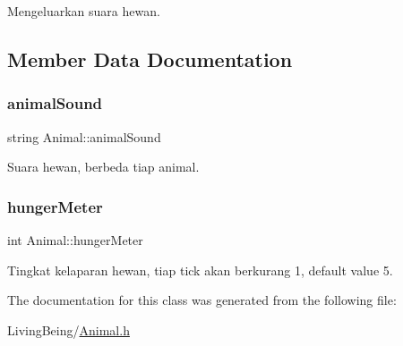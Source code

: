 Mengeluarkan suara hewan. 



\subsection{Member Data Documentation}
\mbox{\label{classAnimal_a085fb0d50fc205ef61891e33c8dcb737}} 
\subsubsection{\texorpdfstring{animalSound}{animalSound}}
{\footnotesize\ttfamily string Animal\+::animal\+Sound\hspace{0.3cm}{\ttfamily [protected]}}



Suara hewan, berbeda tiap animal. 

\mbox{\label{classAnimal_a7b6c94227fc60ac60d5506fb5e857fd9}} 
\subsubsection{\texorpdfstring{hungerMeter}{hungerMeter}}
{\footnotesize\ttfamily int Animal\+::hunger\+Meter\hspace{0.3cm}{\ttfamily [protected]}}



Tingkat kelaparan hewan, tiap tick akan berkurang 1, default value 5. 



The documentation for this class was generated from the following file\+:\begin{DoxyCompactItemize}
\item 
Living\+Being/\mbox{\hyperlink{Animal_8h}{Animal.\+h}}\end{DoxyCompactItemize}
